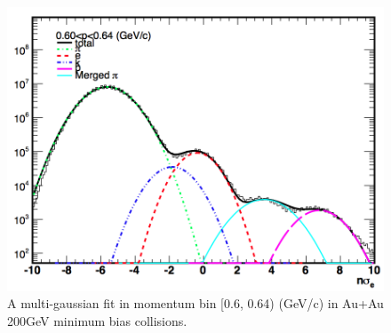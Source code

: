 \begin{figure}
\begin{centering}
\includegraphics[scale=0.4]{fig/3.Analysis/Additional/purity/muliFit}
\par\end{centering}

\protect\caption{A multi-gaussian fit in momentum bin {[}0.6, 0.64) (GeV/c) in Au+Au
200GeV minimum bias collisions. }


\label{fig:muli fit ex}
\end{figure}


